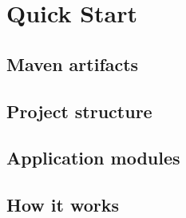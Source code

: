 \chapter{Quick Start}\label{ch:00}

\section{Maven artifacts}

\section{Project structure}

\section{Application modules}

\section{How it works}

